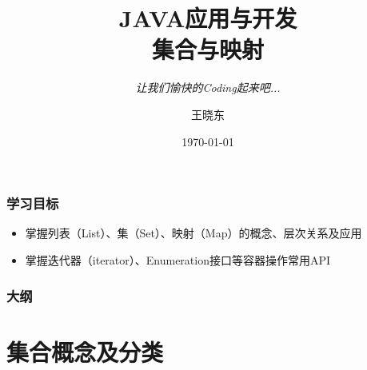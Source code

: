 
\title{\hei JAVA应用与开发\\  集合与映射}
\subtitle{\it 让我们愉快的Coding起来吧...}
\author{王晓东}
\date{\today}


\begin{frame}
  \maketitle
\end{frame}

\begin{frame}
  \frametitle{学习目标}
  \begin{itemize}
  \item 掌握列表（List）、集（Set）、映射（Map）的概念、层次关系及应用
  \item 掌握迭代器（iterator）、Enumeration接口等容器操作常用API
  \end{itemize}
\end{frame}

\begin{frame}
  \frametitle{大纲}
  \tableofcontents
\end{frame}

\section{集合概念及分类}



